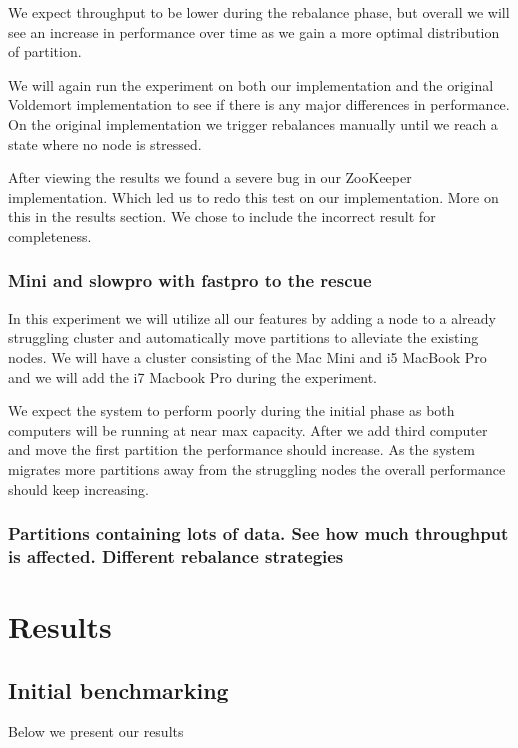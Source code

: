 We expect throughput to be lower during the rebalance phase, but overall we will see an increase in performance over time as we gain a more optimal distribution of partition. 

We will again run the experiment on both our implementation and the original Voldemort implementation to see if there is any major differences in performance. On the original implementation we trigger rebalances manually until we reach a state where no node is stressed. 

After viewing the results we found a severe bug in our ZooKeeper implementation. Which led us to redo this test on our implementation. More on this in the results section. We chose to include the incorrect result for completeness. 


\subsubsection{Mini and slowpro with fastpro to the rescue}
In this experiment we will utilize all our features by adding a node to a already struggling cluster and automatically move partitions to alleviate the existing nodes. We will have a cluster consisting of the Mac Mini and i5 MacBook Pro and we will add the i7 Macbook Pro during the experiment. 

We expect the system to perform poorly during the initial phase as both computers will be running at near max capacity. After we add third computer and move the first partition the performance should increase. As the system migrates more partitions away from the struggling nodes the overall performance should keep increasing. 

\subsubsection{Partitions containing lots of data. See how much throughput is affected. Different rebalance strategies}





\section{Results}

\subsection{Initial benchmarking}
Below we present our results








